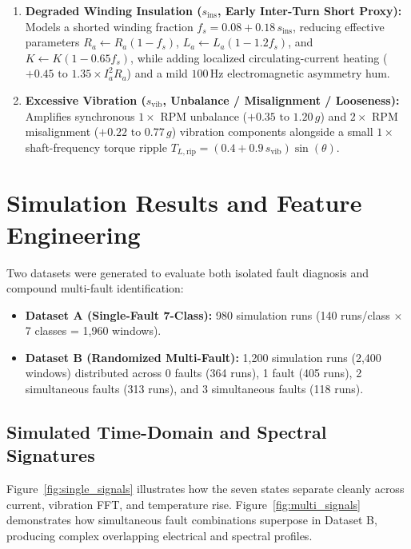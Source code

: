 \documentclass[11pt,a4paper]{article}
\begin{document}
\begin{enumerate}[leftmargin=*, itemsep=4pt]
    \item \textbf{Degraded Winding Insulation ($s_{\text{ins}}$, Early Inter-Turn Short Proxy):} Models a shorted winding fraction $f_s = 0.08 + 0.18\,s_{\text{ins}}$, reducing effective parameters $R_a \leftarrow R_a(1 - f_s)$, $L_a \leftarrow L_a(1 - 1.2 f_s)$, and $K \leftarrow K(1 - 0.65 f_s)$, while adding localized circulating-current heating ($+0.45\text{ to }1.35\times I_a^2 R_a$) and a mild $100\,\text{Hz}$ electromagnetic asymmetry hum.
    
    \item \textbf{Excessive Vibration ($s_{\text{vib}}$, Unbalance / Misalignment / Looseness):} Amplifies synchronous $1\times$ RPM unbalance ($+0.35\text{ to }1.20\,g$) and $2\times$ RPM misalignment ($+0.22\text{ to }0.77\,g$) vibration components alongside a small $1\times$ shaft-frequency torque ripple $T_{L,\text{rip}} = (0.4 + 0.9\,s_{\text{vib}})\sin(\theta)$.
\end{enumerate}

\section{Simulation Results and Feature Engineering}

Two datasets were generated to evaluate both isolated fault diagnosis and compound multi-fault identification:
\begin{itemize}[noitemsep]
    \item \textbf{Dataset A (Single-Fault 7-Class):} 980 simulation runs (140 runs/class $\times$ 7 classes = 1,960 windows).
    \item \textbf{Dataset B (Randomized Multi-Fault):} 1,200 simulation runs (2,400 windows) distributed across 0 faults (364 runs), 1 fault (405 runs), 2 simultaneous faults (313 runs), and 3 simultaneous faults (118 runs).
\end{itemize}

\subsection{Simulated Time-Domain and Spectral Signatures}

Figure~\ref{fig:single_signals} illustrates how the seven states separate cleanly across current, vibration FFT, and temperature rise. Figure~\ref{fig:multi_signals} demonstrates how simultaneous fault combinations superpose in Dataset B, producing complex overlapping electrical and spectral profiles.
\end{document}
